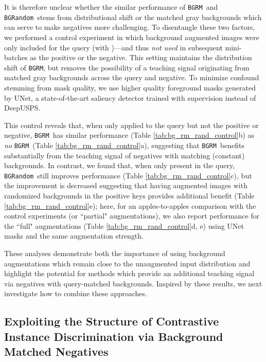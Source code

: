 \documentclass[twoside,11pt]{article}
\newcommand{\bgrm}{\texttt{BG\textunderscore RM}}
\newcommand{\bgrand}{\texttt{BG\textunderscore Random}}
\begin{document}
It is therefore unclear whether the similar performance of \bgrm~and \bgrand~stems from distributional shift or the matched gray backgrounds which can serve to make negatives more challenging. To disentangle these two factors, we performed a control experiment in which background augmented images were only included for the query (with )---and thus \textit{not used} in subsequent mini-batches as the positive or the negative. This setting maintains the distribution shift of \bgrm, but removes the possibility of a teaching signal originating from matched gray backgrounds across the query and negative. To minimize confound stemming from mask quality, we use higher quality foreground masks generated by UNet, a state-of-the-art saliency detector trained with supervision instead of DeepUSPS.

This control reveals that, when only applied to the query but not the positive or negative, \bgrm~has similar performance (Table \ref{tab:bg_rm_rand_control}b) as \textit{no} \bgrm~(Table \ref{tab:bg_rm_rand_control}a), suggesting that \bgrm~benefits substantially from the teaching signal of negatives with matching (constant) backgrounds. In contrast, we found that, when only present in the query, \bgrand~still improves performance (Table \ref{tab:bg_rm_rand_control}c), but the improvement is decreased suggesting that having augmented images with randomized backgrounds in the positive keys provides additional benefit (Table \ref{tab:bg_rm_rand_control}e); here, for an apples-to-apples comparison with the control experiments (or ``partial" augmentations), we also report performance for the ``full" augmentations (Table \ref{tab:bg_rm_rand_control}d, e) using UNet masks and the same augmentation strength.

These analyses demonstrate both the importance of using background augmentations which remain close to the unaugmented input distribution and highlight the potential for methods which provide an additional teaching signal via negatives with query-matched backgrounds. Inspired by these results, we next investigate how to combine these approaches. 

\subsection{Exploiting the Structure of Contrastive Instance Discrimination via Background Matched Negatives} \label{sec:bgswap}
\end{document}
